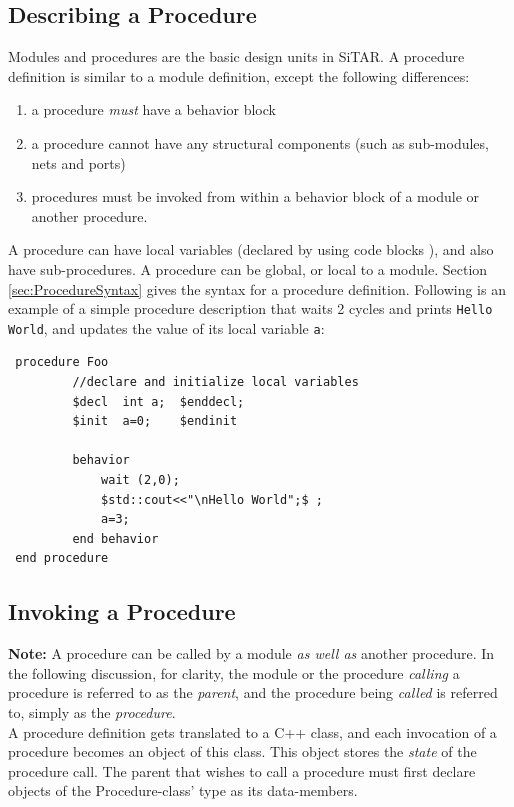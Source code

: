 \documentclass[12pt,a4paper]{report}
\begin{document}
	\subsection{Describing a Procedure}
	Modules and procedures are the basic design units in SiTAR. A procedure definition 
	is similar to a module definition, except the following differences:
	\begin{enumerate}
	\item a procedure \emph{must} have a behavior block
	\item a procedure cannot have any structural components (such as sub-modules, nets and ports)
	\item procedures must be invoked from within a behavior block of a module or another procedure.
	\end{enumerate}
	A procedure can have local variables (declared by using code blocks ),
	and also have sub-procedures. A procedure can be global, or local to a module. 
	Section \ref{sec:ProcedureSyntax} gives the syntax for a procedure definition.
	Following is an example of a simple procedure description that waits 2 cycles 
	and prints \texttt{Hello World}, and updates the value of its local variable \texttt{a}:
\begin{verbatim}
 procedure Foo
         //declare and initialize local variables
         $decl  int a;  $enddecl;
         $init  a=0;    $endinit

         behavior 
             wait (2,0);
             $std::cout<<"\nHello World";$ ;
             a=3;
         end behavior
 end procedure
\end{verbatim}


	\subsection{Invoking a Procedure}
	\textbf{Note:} A procedure can be called by a module \emph{as well as} another
	procedure.  In the following discussion, for clarity, the module or the
	procedure \emph{calling} a procedure is referred to as the
	\emph{parent}, and the procedure being \emph{called} is referred to,
	simply as the \emph{procedure}.\\

	A procedure definition gets translated to a C++ class, and 
	each invocation of a procedure becomes an object of this class. 
	This object stores the \emph{state} of the procedure call.
	The parent that wishes to call a procedure 
	must first declare objects of the Procedure-class' type as its
	data-members.
\end{document}
